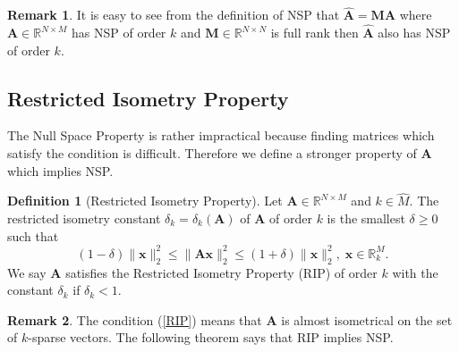 \documentclass[11pt,oneside,czech,american]{book} %
\theoremstyle{definition} %
\theoremstyle{definition}
\newtheorem{defn}{Definition}
\newtheorem{rmrk}{Remark}
\begin{document}
\begin{rmrk}
	It is easy to see from the definition of NSP that $\hat{\bm{A}} = \bm{M} \bm{A}$ where $\bm{A} \in \mathbb{R}^{N \times M}$ has NSP of order $k$ and $\bm{M} \in \mathbb{R}^{N \times N}$ is full rank then $\hat{\bm{A}}$ also has NSP of order $k$.
\end{rmrk}

\subsection*{Restricted Isometry Property}
The Null Space Property is rather impractical because finding matrices which satisfy the condition is difficult. Therefore we define a stronger property of $\bm{A}$ which implies NSP.

\begin{defn}[Restricted Isometry Property]
	Let $\bm{A} \in \mathbb{R}^{N \times M}$ and $k \in \hat{M}$. The restricted isometry constant $\delta_k = \delta_k (\bm{A})$ of $\bm{A}$ of order $k$ is the smallest $\delta \geq 0$ such that
	\begin{equation}
		(1-\delta)\lVert \bm{x} \rVert_{2}^{2} \leq \lVert \bm{A} \bm{x} \rVert_{2}^{2} \leq (1+\delta)\lVert \bm{x} \rVert_{2}^{2}, \;  \bm{x} \in \mathbb{R}^{M}_{k}. \label{RIP}
	\end{equation}
	We say $\bm{A}$ satisfies the Restricted Isometry Property (RIP) of order $k$ with the constant $\delta_k$ if $\delta_k < 1$.
\end{defn}
\pagestyle{headings}

\begin{rmrk}
	The condition (\ref{RIP}) means that $\bm{A}$ is almost isometrical on the set of $k$-sparse vectors. The following theorem says that RIP implies NSP.
\end{rmrk}
\end{document}
